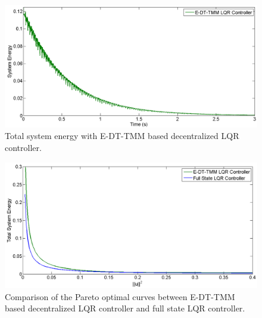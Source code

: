 \documentclass[11pt]{ucthesis}
\begin{document}
\begin{figure}[thpb]
\centering
\includegraphics[width=1\linewidth]{Figures/Mass9Controller_1.png}
\caption{Total system energy with E-DT-TMM based decentralized LQR controller.}
\label{fig:DTTMM9}
\end{figure}
\begin{figure}[thpb]
\centering
\includegraphics[width=1\linewidth]{Figures/ParetoEnergy9.png}
\caption{Comparison of the Pareto optimal curves between E-DT-TMM based decentralized LQR controller and full state LQR controller.}
\label{fig:Pareto9}
\end{figure}
\end{document}
